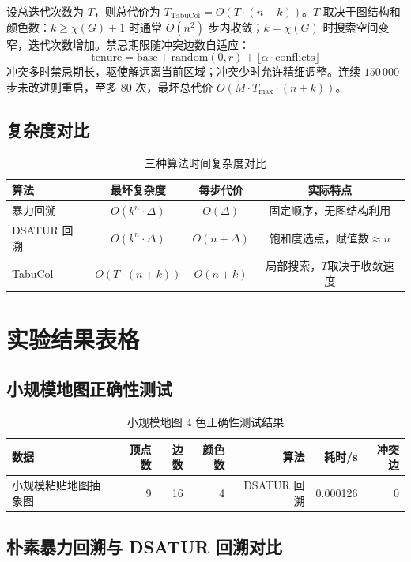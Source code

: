 \documentclass[UTF8,a4paper,12pt]{ctexart}
\begin{document}
设总迭代次数为 $T$，则总代价为 $T_{\mathrm{TabuCol}}=O(T\cdot(n+k))$。$T$ 取决于图结构和颜色数：$k\ge\chi(G)+1$ 时通常 $O(n^2)$ 步内收敛；$k=\chi(G)$ 时搜索空间变窄，迭代次数增加。禁忌期限随冲突边数自适应：
\[
\mathrm{tenure} = \mathrm{base} + \mathrm{random}(0,r) + \lfloor\alpha\cdot\mathrm{conflicts}\rfloor
\]
冲突多时禁忌期长，驱使解远离当前区域；冲突少时允许精细调整。连续 $150\,000$ 步未改进则重启，至多 $80$ 次，最坏总代价 $O(M\cdot T_{\max}\cdot(n+k))$。

\subsection{复杂度对比}

\begin{table}[h]
\centering
\caption{三种算法时间复杂度对比}
\begin{tabular}{lccc}
\toprule
算法 & 最坏复杂度 & 每步代价 & 实际特点 \\
\midrule
暴力回溯 & $O(k^n\cdot\Delta)$ & $O(\Delta)$ & 固定顺序，无图结构利用 \\
DSATUR 回溯 & $O(k^n\cdot\Delta)$ & $O(n+\Delta)$ & 饱和度选点，赋值数$\approx n$ \\
TabuCol & $O(T\cdot(n+k))$ & $O(n+k)$ & 局部搜索，$T$取决于收敛速度 \\
\bottomrule
\end{tabular}
\end{table}

\section{实验结果表格}

\subsection{小规模地图正确性测试}

\begin{table}[h]
\centering
\caption{小规模地图 4 色正确性测试结果}
\begin{tabular}{lrrrrrr}
\toprule
数据 & 顶点数 & 边数 & 颜色数 & 算法 & 耗时/s & 冲突边 \\
\midrule
小规模粘贴地图抽象图 & 9 & 16 & 4 & DSATUR 回溯 & 0.000126 & 0 \\
\bottomrule
\end{tabular}
\end{table}

\subsection{朴素暴力回溯与 DSATUR 回溯对比}
\end{document}
